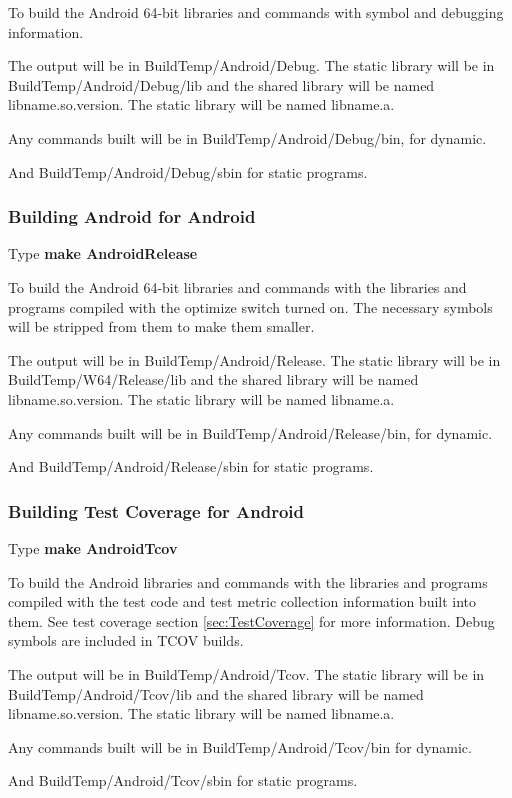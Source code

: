 To build the Android 64-bit libraries and commands with symbol
and debugging information.

The output will be in BuildTemp/Android/Debug.
The static library will be in BuildTemp/Android/Debug/lib
and the shared library will be named lib{name}.so.{version}.
The static library will be named lib{name}.a.
  
Any commands built will be in BuildTemp/Android/Debug/bin,
for dynamic.
  
And BuildTemp/Android/Debug/sbin for static programs.

\subsubsection{Building Android for Android}
Type \textbf{make AndroidRelease}

To build the Android 64-bit libraries and commands with the libraries
and programs compiled with the optimize switch turned on.
The necessary symbols will be stripped from them to make
them smaller.

The output will be in BuildTemp/Android/Release.
The static library will be in BuildTemp/W64/Release/lib
and the shared library will be named lib{name}.so.{version}.
The static library will be named lib{name}.a.
  
Any commands built will be in BuildTemp/Android/Release/bin,
for dynamic.
  
And BuildTemp/Android/Release/sbin for static programs.
  
\subsubsection{Building Test Coverage for Android}
Type \textbf{make AndroidTcov}

To build the Android libraries and commands with the libraries
and programs compiled with the test code and test metric
collection information built into them.
See test coverage section \ref{sec:TestCoverage} for more information.
Debug symbols are included in TCOV builds.

The output will be in BuildTemp/Android/Tcov.
The static library will be in BuildTemp/Android/Tcov/lib
and the shared library will be named lib{name}.so.{version}.
The static library will be named lib{name}.a.
  
Any commands built will be in BuildTemp/Android/Tcov/bin
for dynamic.

And BuildTemp/Android/Tcov/sbin for static programs.

